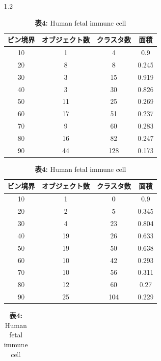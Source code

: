 \documentclass[dvipdfmx,11pt]{kuisthesis}
\begin{document}
\begin{spacing}{1.2}
\begin{table}[h]
  \centering
  \begin{minipage}[b]{0.49\columnwidth}
    \centering
    \scriptsize %
    \begin{tabular}{|c|c|c|c|}
    \hline
    \textbf{ビン境界} & \textbf{オブジェクト数} & \textbf{クラスタ数} & \textbf{面積} \\
    \hline
    10  & 1  & 4   & 0.9   \\
    20  & 8  & 8   & 0.245 \\
    30  & 3  & 15  & 0.919 \\
    40  & 3  & 30  & 0.826 \\
    50  & 11 & 25  & 0.269 \\
    60  & 17 & 51  & 0.237 \\
    70  & 9  & 60  & 0.283 \\
    80  & 16 & 82  & 0.247 \\
    90  & 44 & 128 & 0.173 \\
    \hline
    \end{tabular}
    \caption{\textbf{表3:} Bone marrow mononuclear cell}
  \end{minipage}
  \begin{minipage}[b]{0.49\columnwidth}
    \centering
    \scriptsize %
    \begin{tabular}{|c|c|c|c|}
    \hline
    \textbf{ビン境界} & \textbf{オブジェクト数} & \textbf{クラスタ数} & \textbf{面積} \\
    \hline
    10  & 1  & 0   & 0.9   \\
    20  & 2  & 5   & 0.345 \\
    30  & 4  & 23  & 0.804 \\
    40  & 19 & 26  & 0.633 \\
    50  & 19 & 50  & 0.638 \\
    60  & 10 & 42  & 0.293 \\
    70  & 10 & 56  & 0.311 \\
    80  & 12 & 60  & 0.27  \\
    90  & 25 & 104 & 0.229 \\
    \hline
    \end{tabular}
    \caption{\textbf{表4:} Human fetal immune cell}
  \end{minipage}
  \begin{minipage}[b]{0.49\columnwidth}
    \centering
    \scriptsize %
    \begin{tabular}{|c|c|c|c|}

\end{tabular}
\end{minipage}
\end{table}
\end{spacing}
\end{document}
